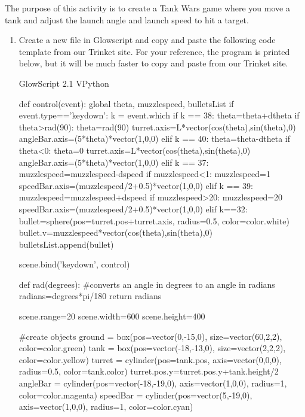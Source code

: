 
\apparatus
{}

\longgoal

The purpose of this activity is to create a Tank Wars game where you move a tank and adjust the launch angle and launch speed to hit a target.

\procedure

\begin{enumerate}
        
\item Create a new file in Glowscript and copy and paste the following code template from our Trinket site. For your reference, the program is printed below, but it will be much faster to copy and paste from our Trinket site.

\begin{vpythonblock}
GlowScript 2.1 VPython

def control(event):
    global theta, muzzlespeed, bulletsList
    if event.type=='keydown':
        k = event.which
        if k == 38:
            theta=theta+dtheta
            if theta>rad(90):
                theta=rad(90)
            turret.axis=L*vector(cos(theta),sin(theta),0)
            angleBar.axis=(5*theta)*vector(1,0,0)
        elif k == 40:
            theta=theta-dtheta
            if theta<0:
                theta=0            
            turret.axis=L*vector(cos(theta),sin(theta),0)
            angleBar.axis=(5*theta)*vector(1,0,0)
        elif k == 37:
            muzzlespeed=muzzlespeed-dspeed
            if muzzlespeed<1:
                muzzlespeed=1
            speedBar.axis=(muzzlespeed/2+0.5)*vector(1,0,0)
        elif k == 39:
            muzzlespeed=muzzlespeed+dspeed
            if muzzlespeed>20:
                muzzlespeed=20
            speedBar.axis=(muzzlespeed/2+0.5)*vector(1,0,0)
        elif k==32:
            bullet=sphere(pos=turret.pos+turret.axis, radius=0.5, color=color.white)
            bullet.v=muzzlespeed*vector(cos(theta),sin(theta),0)
            bulletsList.append(bullet)

scene.bind('keydown', control) 

def rad(degrees): #converts an angle in degrees to an angle in radians
    radians=degrees*pi/180
    return radians

scene.range=20
scene.width=600
scene.height=400

#create objects
ground = box(pos=vector(0,-15,0), size=vector(60,2,2), color=color.green)
tank = box(pos=vector(-18,-13,0), size=vector(2,2,2), color=color.yellow)
turret = cylinder(pos=tank.pos, axis=vector(0,0,0), radius=0.5, color=tank.color)
turret.pos.y=turret.pos.y+tank.height/2
angleBar = cylinder(pos=vector(-18,-19,0), axis=vector(1,0,0), radius=1, color=color.magenta)
speedBar = cylinder(pos=vector(5,-19,0), axis=vector(1,0,0), radius=1, color=color.cyan)


\end{vpythonblock}
\end{enumerate}
